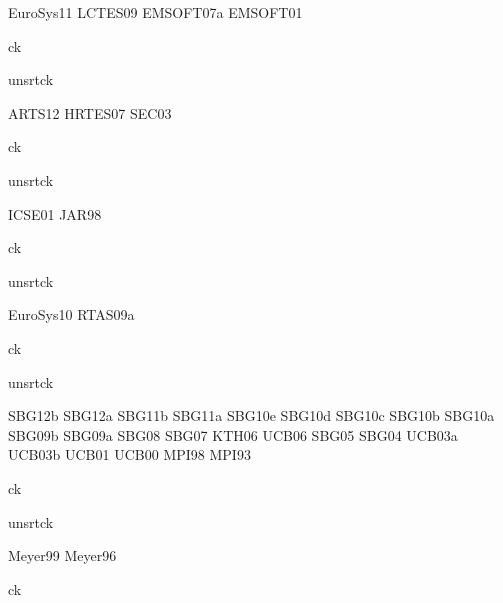 \nocite{books}{EuroSys11}
\nocite{books}{LCTES09}
\nocite{books}{EMSOFT07a}
\nocite{books}{EMSOFT01}

{ck}{}


{unsrtck}

\nocite{chapters}{ARTS12}
\nocite{chapters}{HRTES07}
\nocite{chapters}{SEC03}

{ck}{}


{unsrtck}

\nocite{systems}{ICSE01}
\nocite{systems}{JAR98}

{ck}{}


{unsrtck}

\nocite{posters}{EuroSys10}
\nocite{posters}{RTAS09a}

{ck}{}


{unsrtck}

\nocite{reports}{SBG12b}
\nocite{reports}{SBG12a}
\nocite{reports}{SBG11b}
\nocite{reports}{SBG11a}
\nocite{reports}{SBG10e}
\nocite{reports}{SBG10d}
\nocite{reports}{SBG10c}
\nocite{reports}{SBG10b}
\nocite{reports}{SBG10a}
\nocite{reports}{SBG09b}
\nocite{reports}{SBG09a}
\nocite{reports}{SBG08}
\nocite{reports}{SBG07}
\nocite{reports}{KTH06}
\nocite{reports}{UCB06}
\nocite{reports}{SBG05}
\nocite{reports}{SBG04}
\nocite{reports}{UCB03a}
\nocite{reports}{UCB03b}
\nocite{reports}{UCB01}
\nocite{reports}{UCB00}
\nocite{reports}{MPI98}
\nocite{reports}{MPI93}

{ck}{}


{unsrtck}

\nocite{theses}{Meyer99}
\nocite{theses}{Meyer96}

{ck}{}


